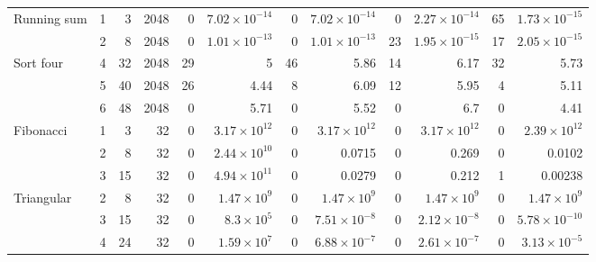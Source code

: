 \begin{table}[htbp]
\begin{tabular*}{\linewidth}{@{\extracolsep{\fill}}lrrr *{4}{rr}@{}}
\addlinespace[0.7pt]
Running sum & 1 & 3 & 2048 & 0 & $7.02\!\times\!10^{-14}$ & 0 & $7.02\!\times\!10^{-14}$ & 0 & $2.27\!\times\!10^{-14}$ & 65 & $1.73\!\times\!10^{-15}$ \\
 & 2 & 8 & 2048 & 0 & $1.01\!\times\!10^{-13}$ & 0 & $1.01\!\times\!10^{-13}$ & 23 & $1.95\!\times\!10^{-15}$ & 17 & $2.05\!\times\!10^{-15}$ \\
\addlinespace[0.7pt]
Sort four & 4 & 32 & 2048 & 29 & 5 & 46 & 5.86 & 14 & 6.17 & 32 & 5.73 \\
 & 5 & 40 & 2048 & 26 & 4.44 & 8 & 6.09 & 12 & 5.95 & 4 & 5.11 \\
 & 6 & 48 & 2048 & 0 & 5.71 & 0 & 5.52 & 0 & 6.7 & 0 & 4.41 \\
\addlinespace[0.7pt]
Fibonacci & 1 & 3 & 32 & 0 & $3.17\!\times\!10^{12}$ & 0 & $3.17\!\times\!10^{12}$ & 0 & $3.17\!\times\!10^{12}$ & 0 & $2.39\!\times\!10^{12}$ \\
 & 2 & 8 & 32 & 0 & $2.44\!\times\!10^{10}$ & 0 & 0.0715 & 0 & 0.269 & 0 & 0.0102 \\
 & 3 & 15 & 32 & 0 & $4.94\!\times\!10^{11}$ & 0 & 0.0279 & 0 & 0.212 & 1 & 0.00238 \\
\addlinespace[0.7pt]
Triangular & 2 & 8 & 32 & 0 & $1.47\!\times\!10^{9}$ & 0 & $1.47\!\times\!10^{9}$ & 0 & $1.47\!\times\!10^{9}$ & 0 & $1.47\!\times\!10^{9}$ \\
 & 3 & 15 & 32 & 0 & $8.3\!\times\!10^{5}$ & 0 & $7.51\!\times\!10^{-8}$ & 0 & $2.12\!\times\!10^{-8}$ & 0 & $5.78\!\times\!10^{-10}$ \\
 & 4 & 24 & 32 & 0 & $1.59\!\times\!10^{7}$ & 0 & $6.88\!\times\!10^{-7}$ & 0 & $2.61\!\times\!10^{-7}$ & 0 & $3.13\!\times\!10^{-5}$ \\
\bottomrule
\end{tabular*}\endgroup
\end{table}


